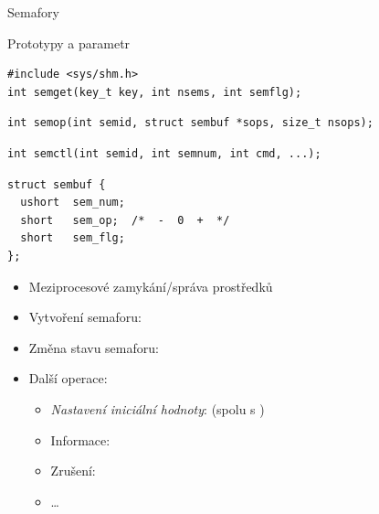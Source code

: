 \begin{frame}[fragile]{Semafory}

  \begin{block}{Prototypy a parametr }
    \begin{lstlisting}[aboveskip=2pt,belowskip=0pt]
#include <sys/shm.h>
int semget(key_t key, int nsems, int semflg);
    \end{lstlisting}
    \begin{lstlisting}[aboveskip=0pt,belowskip=0pt]
int semop(int semid, struct sembuf *sops, size_t nsops);
    \end{lstlisting}
    \begin{lstlisting}[aboveskip=0pt,belowskip=0pt]
int semctl(int semid, int semnum, int cmd, ...);
    \end{lstlisting}
    \begin{lstlisting}[aboveskip=0pt,belowskip=2pt]
struct sembuf {
  ushort  sem_num;
  short   sem_op;  /*  -  0  +  */
  short   sem_flg;
};
    \end{lstlisting}
  \end{block}


  \begin{itemize}
    \item<+-> Meziprocesové zamykání/správa prostředků
    \item<+-> Vytvoření semaforu: 
    \item<+-> Změna stavu semaforu: 
    \item<+-> Další operace: 
    \begin{itemize}
      \item \emph{Nastavení iniciální hodnoty}:  (spolu s
	)
      \item Informace: 
      \item Zrušení: 
      \item \dots
    \end{itemize}
  \end{itemize}

\end{frame}

